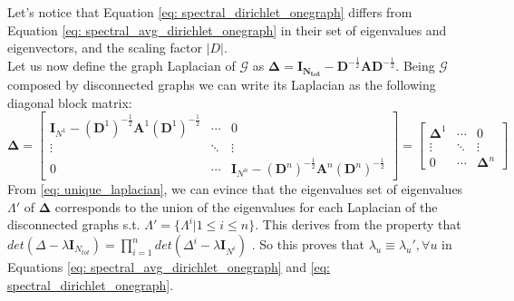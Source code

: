 \documentclass[twoside]{article}
\theoremstyle{definition}
\begin{document}
Let's notice that Equation \eqref{eq: spectral_dirichlet_onegraph} differs from Equation \eqref{eq: spectral_avg_dirichlet_onegraph} in their set of eigenvalues and eigenvectors, and the scaling factor $|D|$.\\
Let us now define the graph Laplacian of $\mathcal{G}$ as $\mathbf{\Delta} = \mathbf{I_{N_{tot}}} - \mathbf{D}^{-\frac{1}{2}}\mathbf{A}\mathbf{D}^{-\frac{1}{2}}$. Being $\mathcal{G}$ composed by disconnected graphs we can write its Laplacian as the following diagonal block matrix:
\begin{equation}
\label{eq: unique_laplacian}
\mathbf{\Delta} = \begin{bmatrix}
\mathbf{I}_{N^1} - (\mathbf{D}^1)^{-\frac{1}{2}}\mathbf{A}^1(\mathbf{D}^1)^{-\frac{1}{2}} & \cdots & 0 \\
\vdots & \ddots & \vdots \\
0 & \cdots & \mathbf{I}_{N^n} - (\mathbf{D}^n)^{-\frac{1}{2}}\mathbf{A}^n(\mathbf{D}^n)^{-\frac{1}{2}}
\end{bmatrix} = \begin{bmatrix}
\mathbf{\Delta}^1 & \cdots & 0 \\
\vdots & \ddots & \vdots \\
0 & \cdots & \mathbf{\Delta}^n
\end{bmatrix}
\end{equation}
From \ref{eq: unique_laplacian}, we can evince that the eigenvalues set of eigenvalues $\Lambda'$ of $\mathbf{\Delta}$ corresponds to the union of the eigenvalues for each Laplacian of the disconnected graphs s.t. $\Lambda' = \{\Lambda^i| 1 \leq i \leq n\}$. This derives from the property that $det(\Delta - \lambda\mathbf{I}_{N_{tot}}) = \prod_{i = 1}^n det(\Delta^i - \lambda\mathbf{I}_{N^i})$ \cite{linear_algebra}. So this proves that $\lambda_u \equiv \lambda_u', \forall u$ in Equations \ref{eq: spectral_avg_dirichlet_onegraph} and \ref{eq: spectral_dirichlet_onegraph}. 
\end{document}
